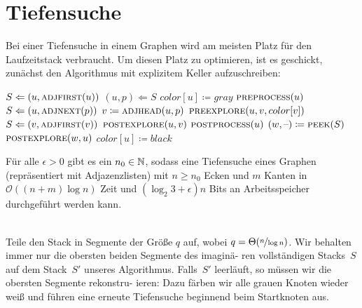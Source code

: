 \documentclass{cheat-sheet}
\renewcommand{\O}{\mathcal{O}} %
\newcommand{\Push}{\Leftarrow} %
\newcommand{\Pop}{\Leftarrow} %
\begin{document}
\section{Tiefensuche}

\begin{alg}
  Bei einer Tiefensuche in einem Graphen wird am meisten Platz für den Laufzeitstack verbraucht. Um diesen Platz zu optimieren, ist es geschickt, zunächst den Algorithmus mit explizitem Keller aufzuschreiben:
  \begin{algorithmic}[1]
      \State $S \Push (u, \Call{adjfirst}{u})$
        \State $(u, p) \Pop S$
          \State $color[u] \coloneqq gray$
          \State $\Call{preprocess}{u}$
        \EndIf
          \State $S \Push (u, \Call{adjnext}{p})$
          \State $v \coloneqq \Call{adjhead}{u, p}$
          \State $\Call{preexplore}{u, v, color[v]}$
            \State $S \Push (v, \Call{adjfirst}{v})$
          \Else
            \State $\Call{postexplore}{u, v}$
          \EndIf
        \Else
          \State $\Call{postprocess}{u}$
            \State $(w, \blank) \coloneqq \Call{peek}{S}$
            \State $\Call{postexplore}{w, u}$
          \EndIf
          \State $color[u] \coloneqq black$
        \EndIf
      \EndWhile
    \EndFunction
  \end{algorithmic}
\end{alg}


\begin{thm}
  Für alle $\epsilon > 0$ gibt es ein $n_0 \in \mathbb{N}$, sodass eine Tiefensuche eines Graphen (repräsentiert mit Adjazenzlisten) mit $n \geq n_0$ Ecken und $m$ Kanten in $\O((n+m) \log n)$ Zeit und $(\log_2 3 + \epsilon) n$ Bits an Arbeitsspeicher durchgeführt werden kann.
\end{thm}

\begin{alg} \mbox{}\\
  Teile den Stack in Segmente der Größe $q$ auf, wobei $q = \Theta(\nicefrac{n}{\log n})$.
  Wir behalten immer nur die obersten beiden Segmente des imaginä- ren vollständigen Stacks~$S$ auf dem Stack~$S'$ unseres Algorithmus.
  Falls~$S'$ leerläuft, so müssen wir die obersten Segmente rekonstru- ieren: Dazu färben wir alle grauen Knoten wieder weiß und führen eine erneute Tiefensuche beginnend beim Startknoten aus.
\end{alg}
\end{document}

